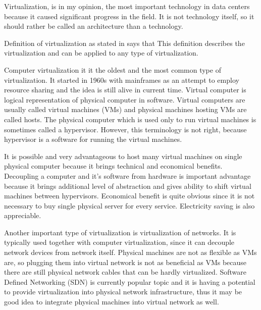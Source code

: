 
Virtualization, is in my opinion, the most important technology in data centers because it caused significant progress in the field. It is not technology itself, so it should rather be called an architecture than a technology.

Definition of virtualization as stated in \cite{virtualization-in-education} says that  This definition describes the virtualization and can be applied to any type of virtualization.

Computer virtualization it it the oldest and the most common type of virtualization.
It started in 1960s with mainframes as an attempt to employ resource sharing and the idea is still alive in current time. 
Virtual computer is logical representation of physical computer in software. \cite{virtualization-in-education} Virtual computers are usually called virtual machines (\Ac{VM}s) and physical machines hosting \Ac{VM}s are called hosts. 
The physical computer which is used only to run virtual machines is sometimes called a hypervisor. However, this terminology is not right, because hypervisor is a software for running the virtual machines.

It is possible and very advantageous to host many virtual machines on single physical computer because it brings technical and economical benefits. Decoupling a computer and it's software from hardware is important advantage because it brings additional level of abstraction and gives ability to shift virtual machines between hypervisors. Economical benefit is quite obvious since it is not necessary to buy single physical server for every service. Electricity saving is also appreciable.

Another important type of virtualization is virtualization of networks. It is typically used together with computer virtualization, since it can decouple network devices from network itself. Physical machines are not as flexible as \Ac{VM}s are, so plugging them into virtual network is not as beneficial as \Ac{VM}s because there are still physical network cables that can be hardly virtualized. Software Defined Networking (\Ac{SDN}) is currently popular topic and it is having a potential to provide virtualization into physical network infrastructure, thus it may be good idea to integrate physical machines into virtual network as well.

